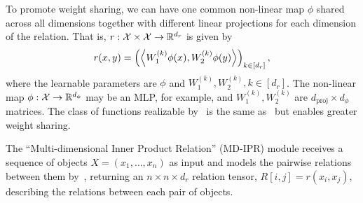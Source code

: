 To promote weight sharing, we can have one common non-linear map $\phi$ shared across all dimensions together with different linear projections for each dimension of the relation. That is, $r: {\mathcal{X}} \times {\mathcal{X}} \to \mathbb{R}^{d_r}$ is given by
\begin{equation}\label{eq:relation_function_lin_proj}
    r(x, y) = \left(\left \langle W_1^{(k)}\phi(x), W_2^{(k)}\phi(y) \right\rangle\right)_{k \in [d_r]},
\end{equation}
where the learnable parameters are $\phi$ and $W_1^{(k)}, W_2^{(k)}, k \in [d_r]$. The non-linear map $\phi: {\mathcal{X}} \to \mathbb{R}^{d_\phi}$ may be an MLP, for example, and $W_1^{(k)}, W_2^{(k)}$ are $d_{\mathrm{proj}} \times d_\phi$ matrices. The class of functions realizable by~ is the same as~ but enables greater weight sharing.

The ``Multi-dimensional Inner Product Relation'' (MD-IPR) module receives a sequence of objects $X = (x_1, \ldots, x_n)$ as input and models the pairwise relations between them by~, returning an $n \times n \times d_r$ relation tensor, $R[i,j] = r(x_i, x_j)$, describing the relations between each pair of objects.

% 